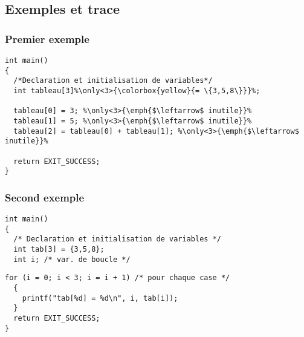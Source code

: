 \documentclass[xcolor=pdftex,svgnames,table]{beamer}
\begin{document}
\subsection{Exemples et trace}
\begin{frame}[fragile]
  \frametitle{Premier exemple}
\pause
\begin{lstlisting}[escapechar={\%},basicstyle=\ttfamily]
int main()
{
  /*Declaration et initialisation de variables*/
  int tableau[3]%\only<3>{\colorbox{yellow}{= \{3,5,8\}}}%;

  tableau[0] = 3; %\only<3>{\emph{$\leftarrow$ inutile}}%
  tableau[1] = 5; %\only<3>{\emph{$\leftarrow$ inutile}}%
  tableau[2] = tableau[0] + tableau[1]; %\only<3>{\emph{$\leftarrow$ inutile}}%

  return EXIT_SUCCESS;  
}
\end{lstlisting}
\end{frame}

\begin{frame}[fragile]
  \frametitle{Second exemple}
\begin{lstlisting}[basicstyle=\ttfamily\scriptsize]
int main()
{
  /* Declaration et initialisation de variables */
  int tab[3] = {3,5,8};
  int i; /* var. de boucle */
\end{lstlisting}
\pause
\begin{lstlisting}[basicstyle=\ttfamily\scriptsize]
  for (i = 0; i < 3; i = i + 1) /* pour chaque case */
  {
    printf("tab[%d] = %d\n", i, tab[i]);
  }
  return EXIT_SUCCESS;  
}
\end{lstlisting}
\end{frame}
\end{document}
